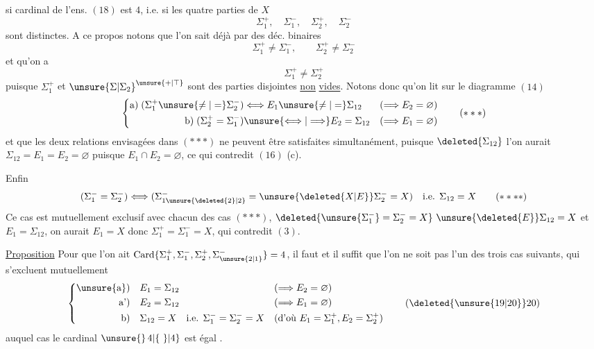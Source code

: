 \begingroup\makeatletter\tagsleft@true\makeatother
si  cardinal de l'ens. $(18)$ est $4$, i.e. si les quatre parties de $X$
\[
\Sigma_1^+,\quad\Sigma_1^-,\quad\Sigma_2^+,\quad\Sigma_2^-
\]
sont distinctes. A ce propos notons que l'on sait déjà par   des déc. binaires
\[
\Sigma_1^+\ne\Sigma_1^-,\qquad\Sigma_2^+\ne\Sigma_2^-
\tag*{($*$)}
\]
et qu'on a
\[
\Sigma_1^+\ne\Sigma_2^+
\tag*{($**$)}
\]
puisque $\Sigma_1^+$ et $\unsure{\Sigma|\Sigma_2}^{\unsure{+|\top}}$ sont des parties disjointes \uline{non} \uline{vides}. Notons donc qu'on lit sur le diagramme $(14)$
\[
\left\{\begin{aligned}
\text{a)}\;(\Sigma_1^+\unsure{\ne|=}\Sigma_2^-)&\Longleftrightarrow E_1\unsure{\ne|=}\Sigma_{12}
   &(\Longrightarrow E_2=\varnothing)\\
\text{b)}\;(\Sigma_2^+=\Sigma_1^-)&\unsure{\Longleftrightarrow|\Longrightarrow} E_2=\Sigma_{12}
   &(\Longrightarrow E_1=\varnothing)
\end{aligned}\right.
\tag*{($***$)}
\]
et que les deux relations  envisagées dans $(***)$ ne peuvent être satisfaites simultanément, puisque $\deleted{\Sigma_{12}}$ l'on aurait $\Sigma_{12}=E_1=E_2=\varnothing$ puisque $E_1\cap E_2=\varnothing$, ce qui contredit $(16)$ (c).

Enfin
\[
(\Sigma_1^-=\Sigma_2^-)\Longleftrightarrow
(\Sigma_{1\unsure{\deleted{2}|2}}^-=\unsure{\deleted{X|E}}\Sigma_2^-=X)
\quad\text{i.e. }\Sigma_{12}=X
\tag*{($****$)}
\]
Ce cas est mutuellement exclusif avec chacun des cas $(***)$,   $\deleted{\unsure{\Sigma_1^-}=\Sigma_2^-=X}\ \unsure{\deleted{E}}\Sigma_{12}=X$ et $E_1=\Sigma_{12}$, on aurait $E_1=X$ donc $\Sigma_1^+=\Sigma_1^-=X$,  qui contredit $(3)$.

\uline{Proposition} Pour que l'on ait $\operatorname{Card}\{\Sigma_1^+,\Sigma_1^-,\Sigma_2^+,\Sigma_{\unsure{2|1}}^-\}=4$, il faut et il suffit que l'on ne soit pas l'un des trois cas suivants, qui s'excluent mutuellement
\[
\left\{\begin{aligned}
\text{\unsure{a})}\quad &E_1=\Sigma_{12}&&(\Longrightarrow E_2=\varnothing)\\
\text{a')}\quad &E_2=\Sigma_{12}&&(\Longrightarrow E_1=\varnothing)\\
\text{b)}\quad &\Sigma_{12}=X\quad\text{i.e. }\Sigma_1^-=\Sigma_2^-=X
   &&(\text{d'où }E_1=\Sigma_1^+,E_2=\Sigma_2^+)
\end{aligned}\right.
\tag*{(\deleted{\unsure{19|20}}20)}
\]
auquel cas le cardinal  $\unsure{\}\,4|\{\ \}|4}$ est égal  .

